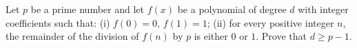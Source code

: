 Let $p$ be a prime number and let $f(x)$ be a polynomial of degree $d$ with integer coefficients such that:
(i) $f(0) = 0$, $f(1) = 1$;
(ii) for every positive integer $n$, the remainder of the division of $f(n)$ by $p$ is either $0$ or $1$.
Prove that $d \geq p - 1$.
